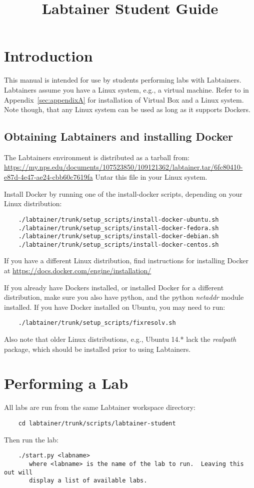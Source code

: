 \documentclass[12pt]{article}
\begin{document}
\title {Labtainer Student Guide}
\maketitle

\section {Introduction}
This manual is intended for use by students performing labs with Labtainers.
Labtainers assume you have a Linux system, e.g., a virtual machine.  Refer to
in Appendix~\ref{sec:appendixA} for installation of Virtual Box and a Linux system.
Note though, that any Linux system can be used as long as it supports Dockers.

\subsection{Obtaining Labtainers and installing Docker}
The Labtainers environment is distributed as a tarball from:
\url{https://my.nps.edu/documents/107523850/109121362/labtainer.tar/6fc80410-e87d-4e47-ae24-cbb60c7619fa}
Untar this file in your Linux system.

Install Docker by running one of the install-docker scripts, depending on your Linux
distribution:
\begin{verbatim}
    ./labtainer/trunk/setup_scripts/install-docker-ubuntu.sh
    ./labtainer/trunk/setup_scripts/install-docker-fedora.sh
    ./labtainer/trunk/setup_scripts/install-docker-debian.sh
    ./labtainer/trunk/setup_scripts/install-docker-centos.sh
\end{verbatim}
If you have a different Linux distribution, find instructions for installing Docker at
\url{https://docs.docker.com/engine/installation/}

If you already have Dockers installed, or installed Docker for a different distribution,
make sure you also have python, and
the python \textit{netaddr} module installed.  If you have Docker installed on Ubuntu, you
may need to run:
\begin{verbatim}
    ./labtainer/trunk/setup_scripts/fixresolv.sh
\end{verbatim}
\noindent Also note that older Linux distributions, e.g., Ubuntu 14.* lack the
\textit{realpath} package, which should be installed prior to using Labtainers.

\section{Performing a Lab}
All labs are run from the same Labtainer workspace directory:
\begin{verbatim}
    cd labtainer/trunk/scripts/labtainer-student
\end{verbatim}
\noindent Then run the lab:
\begin{verbatim}
    ./start.py <labname>
       where <labname> is the name of the lab to run.  Leaving this out will 
       display a list of available labs.
\end{verbatim}
\end{document}
